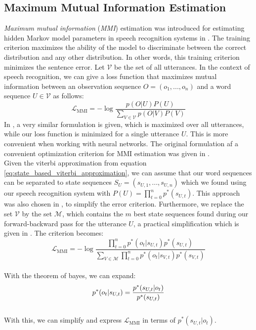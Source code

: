 \subsection{Maximum Mutual Information Estimation}
\label{sec:mmie}
\textit{Maximum mutual information} (\textit{MMI}) estimation was introduced for estimating hidden Markov model parameters in speech recognition systems in \cite{bahl1986maximum}. The training criterion maximizes the ability of the model to discriminate between the correct distribution and any other distribution. In other words, this training criterion minimizes the sentence error. Let $\mathcal{V}$ be the set of all utterances. In the context of speech recognition, we can give a loss function that maximizes mutual information between an observation sequence $O = (o_1, ..., o_n)$ and a word sequence $U \in \mathcal{V}$ as follows:
\[
\mathcal{L}_{\text{MMI}} = -\log\frac{p(O|U)P(U)}{\sum_{V \in \mathcal{V}} p(O|V)P(V)} 
\]
In \cite{ghoshal2013sequence}, a very similar formulation is given, which is maximized over all utterances, while our loss function is minimized for a single utterance $U$. This is more convenient when working with neural networks. The original formulation af a convenient optimization criterion for MMI estimation was given in \cite{schluter1998comparison}.\\
Given the viterbi approximation from equation \ref{eq:state_based_viterbi_approximation}, we can assume that our word sequences can be separated to state sequences $S_U = (s_{U,1},...,s_{U,n})$ which we found using our speech recognition system with $P(U) = \prod_{t = 0}^{n} p^*(s_{U,t})$. This approach was also chosen in \cite{bahl1986maximum}, to simplify the error criterion. Furthermore, we replace the set $\mathcal{V}$ by the set $\mathcal{M}$, which contains the $m$ best state sequences found during our forward-backward pass for the utterance $U$, a practical simplification which is given in \cite{schluter1998comparison}. The criterion becomes: 
\\ 
\[
\mathcal{L}_{\text{MMI}} = -\log\frac{\prod_{t = 0}^{n} p^*(o_{t}|s_{U,t})p^*(s_{U,t})}{\sum_{V \in \mathcal{M}} \prod_{t = 0}^{n} p^*(o_{t}|s_{V,t})p^*(s_{V,t})} 
\] \\
With the theorem of bayes, we can expand:
\[ \\
p^*(o_{t}|s_{U,t}) = \frac{p^*(s_{U,t}|o_{t})}{p^*(s_{U,t})}
\] \\
With this, we can simplify and express $\mathcal{L}_{\text{MMI}}$ in terms of $p^*(s_{U,t}|o_{t})$. \\
